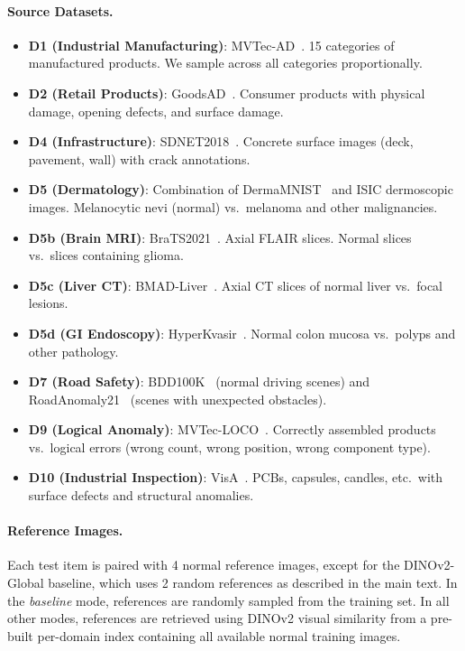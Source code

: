 \paragraph{Source Datasets.}
\begin{itemize}[leftmargin=*,itemsep=2pt]
    \item \textbf{D1 (Industrial Manufacturing)}: MVTec-AD~\citep{bergmann2019mvtec}. 15 categories of manufactured products. We sample across all categories proportionally.
    \item \textbf{D2 (Retail Products)}: GoodsAD~\citep{liang2023goodsad}. Consumer products with physical damage, opening defects, and surface damage.
    \item \textbf{D4 (Infrastructure)}: SDNET2018~\citep{dorafshan2018sdnet}. Concrete surface images (deck, pavement, wall) with crack annotations.
    \item \textbf{D5 (Dermatology)}: Combination of DermaMNIST~\citep{yang2023medmnist} and ISIC dermoscopic images. Melanocytic nevi (normal) vs.\ melanoma and other malignancies.
    \item \textbf{D5b (Brain MRI)}: BraTS2021~\citep{baid2021brats}. Axial FLAIR slices. Normal slices vs.\ slices containing glioma.
    \item \textbf{D5c (Liver CT)}: BMAD-Liver~\citep{bao2024bmad}. Axial CT slices of normal liver vs.\ focal lesions.
    \item \textbf{D5d (GI Endoscopy)}: HyperKvasir~\citep{borgli2020hyperkvasir}. Normal colon mucosa vs.\ polyps and other pathology.
    \item \textbf{D7 (Road Safety)}: BDD100K~\citep{yu2020bdd100k} (normal driving scenes) and RoadAnomaly21~\citep{lis2019detecting} (scenes with unexpected obstacles).
    \item \textbf{D9 (Logical Anomaly)}: MVTec-LOCO~\citep{bergmann2022mvtecloco}. Correctly assembled products vs.\ logical errors (wrong count, wrong position, wrong component type).
    \item \textbf{D10 (Industrial Inspection)}: VisA~\citep{zou2022visa}. PCBs, capsules, candles, etc.\ with surface defects and structural anomalies.
\end{itemize}

\paragraph{Reference Images.}
Each test item is paired with 4 normal reference images, except for the DINOv2-Global baseline, which uses 2 random references as described in the main text. In the \emph{baseline} mode, references are randomly sampled from the training set. In all other modes, references are retrieved using DINOv2 visual similarity from a pre-built per-domain index containing all available normal training images.

